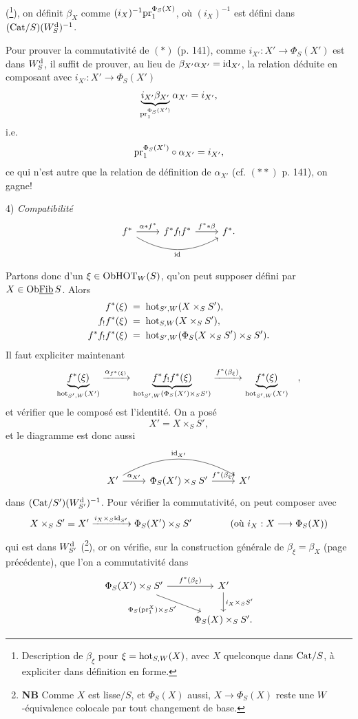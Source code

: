 (\footnote[70]{Description de $\beta_\xi$ pour $\xi=\mathrm{hot}_{S,W}(X)$, avec $X$ quelconque dans $\mathrm{Cat}/S$, à expliciter dans définition en forme.}), on définit $\beta_X$ comme $(i_X)^{-1}\mathrm{pr}_1^{\Phi_S(X)}$, où $(i_X)^{-1}$ est défini dans $(\mathrm{Cat}/S)(W^{\mathrm{d}}_S)^{-1}$.

Pour prouver la commutativité de $(*)$ (p. 141), comme $i_{X'} : X'\longrightarrow\Phi_S(X')$ est dans $W^{\mathrm{d}}_S$, il suffit de prouver, au lieu de $\beta_{X'}\alpha_{X'} = \mathrm{id}_{X'}$, la relation déduite en composant avec $i_{X'} : X'\longrightarrow\Phi_S(X')$
\[
\underbrace{i_{X'}\beta_{X'}}_{\mathrm{pr}_1^{\Phi_S(X')}}\alpha_{X'} = i_{X'},
\]
i.e.
\[
\mathrm{pr}_1^{\Phi_S(X')}\circ\alpha_{X'} = i_{X'},
\]
ce qui n'est autre que la relation de définition de $\alpha_{X'}$ (cf. $(**)$ p. 141), on gagne!

4) \textit{Compatibilité}
\[
\begin{tikzcd}
f^* \arrow[r, "\alpha*f^*"] \arrow[rr, bend right, "\id"'] & f^*f_!f^* \arrow[r, "f^**\beta"] & f^*.
\end{tikzcd}
\]

\leavevmode{}Partons donc d'un $\xi\in\mathrm{Ob}\mathrm{HOT}_W(S)$, qu'on peut supposer défini par $X\in\mathrm{Ob}\underline{\mathrm{Fib}}\,S$. Alors
\[
\begin{aligned}
f^*(\xi) &\;=\; \mathrm{hot}_{S',W}(X\times_S S'),\\
f_!f^*(\xi) &\;=\; \mathrm{hot}_{S,W}(X\times_S S'),\\
f^*f_!f^*(\xi) &\;=\; \mathrm{hot}_{S',W}(\Phi_S(X\times_S S')\times_S S').
\end{aligned}
\]
Il faut expliciter maintenant
\[
\underbrace{f^*(\xi)}_{\mathrm{hot}_{S',W}(X')} \xrightarrow{\alpha_{f^*(\xi)}} \underbrace{f^*f_!f^*(\xi)}_{\mathrm{hot}_{S',W}(\Phi_S(X')\times_S S')} \xrightarrow{f^*(\beta_\xi)} \underbrace{f^*(\xi)}_{\mathrm{hot}_{S',W}(X')} \quad ,
\]
et vérifier que le composé est l'identité. On a posé
\[
X' = X\times_S S',
\]
et le diagramme est donc aussi
\[
\begin{tikzcd}
X' \arrow[r, "{\alpha_{X'}}"] \arrow[rr, bend left, "{\id_{X'}}"] & \Phi_S(X')\times_S S' \arrow[r, "f^*(\beta_\xi)"] & X' %
\end{tikzcd}
\]
dans $(\mathrm{Cat}/S')(W^{\mathrm{d}}_{S'})^{-1}$. Pour vérifier la commutativité, on peut composer avec
\[
X\times_S S' = X' \xrightarrow{i_X\times_S\mathrm{id}_{S'}} \Phi_S(X')\times_S S' \qquad\qquad \text{(où } i_X : X\longrightarrow\Phi_S(X)\text{)}
\]
qui est dans $W^{\mathrm{d}}_{S'}$ (\footnote[71]{\textbf{NB} Comme $X$ est lisse$/S$, et $\Phi_S(X)$ aussi, $X\longrightarrow\Phi_S(X)$ reste une $W$-équivalence colocale par tout changement de base.}), or on vérifie, sur la construction générale de $\beta_\xi=\beta_X$ (page précédente), que l'on a commutativité dans
\[
\begin{tikzcd}
\Phi_S(X')\times_S S' \arrow[r, "f^*(\beta_\xi)"] \arrow[dr, "\Phi_S(\pr_1^X)\times_S S'"'] & X' \arrow[d, "i_X\times_S S'"] \\
 & \Phi_S(X)\times_S S'.
\end{tikzcd}
\]

